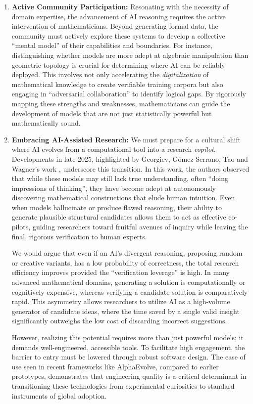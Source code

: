 \documentclass[11pt]{article}
\numberwithin{equation}{section}
\begin{document}
\begin{enumerate}
    \item \textbf{Active Community Participation:} Resonating with the necessity of domain expertise, the advancement of AI reasoning requires the active intervention of mathematicians. Beyond generating formal data, the community must actively explore these systems to develop a collective ``mental model'' of their capabilities and boundaries. For instance, distinguishing whether models are more adept at algebraic manipulation than geometric topology is crucial for determining where AI can be reliably deployed. This involves not only accelerating the \textit{digitalization} of mathematical knowledge to create verifiable training corpora but also engaging in ``adversarial collaboration'' to identify logical gaps. By rigorously mapping these strengths and weaknesses, mathematicians can guide the development of models that are not just statistically powerful but mathematically sound.
    
    \item \textbf{Embracing AI-Assisted Research:} We must prepare for a cultural shift where AI evolves from a computational tool into a research \textit{copilot}. Developments in late 2025, highlighted by Georgiev, G{\'o}mez-Serrano, Tao and Wagner's work \cite{georgiev2025mathematical}, underscore this transition. In this work, the authors observed that while these models may still lack true understanding, often ``doing impressions of thinking'', they have become adept at autonomously discovering mathematical constructions that elude human intuition. Even when models hallucinate or produce flawed reasoning, their ability to generate plausible structural candidates allows them to act as effective co-pilots, guiding researchers toward fruitful avenues of inquiry while leaving the final, rigorous verification to human experts.
    
    We would argue that even if an AI's divergent reasoning, proposing random or creative variants, has a low probability of correctness, the total research efficiency improves provided the ``verification leverage'' is high. In many advanced mathematical domains, generating a solution is computationally or cognitively expensive, whereas verifying a candidate solution is comparatively rapid. This asymmetry allows researchers to utilize AI as a high-volume generator of candidate ideas, where the time saved by a single valid insight significantly outweighs the low cost of discarding incorrect suggestions.
    
    However, realizing this potential requires more than just powerful models; it demands well-engineered, accessible tools. To facilitate high engagement, the barrier to entry must be lowered through robust software design. The ease of use seen in recent frameworks like AlphaEvolve, compared to earlier prototypes, demonstrates that engineering quality is a critical determinant in transitioning these technologies from experimental curiosities to standard instruments of global adoption.
    

\end{enumerate}
\end{document}

